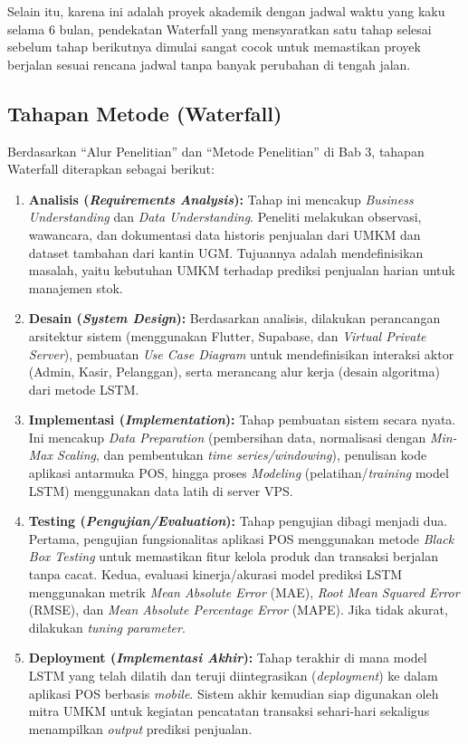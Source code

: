 \documentclass[12pt, a4paper]{article}
\begin{document}
Selain itu, karena ini adalah proyek akademik dengan jadwal waktu yang kaku selama 6 bulan, pendekatan Waterfall yang mensyaratkan satu tahap selesai sebelum tahap berikutnya dimulai sangat cocok untuk memastikan proyek berjalan sesuai rencana jadwal tanpa banyak perubahan di tengah jalan.

\subsection{Tahapan Metode (Waterfall)}
Berdasarkan ``Alur Penelitian'' dan ``Metode Penelitian'' di Bab 3, tahapan Waterfall diterapkan sebagai berikut:

\begin{enumerate}[label=\arabic*)]
    \item \textbf{Analisis (\textit{Requirements Analysis}):}
    Tahap ini mencakup \textit{Business Understanding} dan \textit{Data Understanding}. Peneliti melakukan observasi, wawancara, dan dokumentasi data historis penjualan dari UMKM dan dataset tambahan dari kantin UGM. Tujuannya adalah mendefinisikan masalah, yaitu kebutuhan UMKM terhadap prediksi penjualan harian untuk manajemen stok.
    
    \item \textbf{Desain (\textit{System Design}):}
    Berdasarkan analisis, dilakukan perancangan arsitektur sistem (menggunakan Flutter, Supabase, dan \textit{Virtual Private Server}), pembuatan \textit{Use Case Diagram} untuk mendefinisikan interaksi aktor (Admin, Kasir, Pelanggan), serta merancang alur kerja (desain algoritma) dari metode LSTM.
    
    \item \textbf{Implementasi (\textit{Implementation}):}
    Tahap pembuatan sistem secara nyata. Ini mencakup \textit{Data Preparation} (pembersihan data, normalisasi dengan \textit{Min-Max Scaling}, dan pembentukan \textit{time series/windowing}), penulisan kode aplikasi antarmuka POS, hingga proses \textit{Modeling} (pelatihan/\textit{training} model LSTM) menggunakan data latih di server VPS.
    
    \item \textbf{Testing (\textit{Pengujian/Evaluation}):}
    Tahap pengujian dibagi menjadi dua. Pertama, pengujian fungsionalitas aplikasi POS menggunakan metode \textit{Black Box Testing} untuk memastikan fitur kelola produk dan transaksi berjalan tanpa cacat. Kedua, evaluasi kinerja/akurasi model prediksi LSTM menggunakan metrik \textit{Mean Absolute Error} (MAE), \textit{Root Mean Squared Error} (RMSE), dan \textit{Mean Absolute Percentage Error} (MAPE). Jika tidak akurat, dilakukan \textit{tuning parameter}.
    
    \item \textbf{Deployment (\textit{Implementasi Akhir}):}
    Tahap terakhir di mana model LSTM yang telah dilatih dan teruji diintegrasikan (\textit{deployment}) ke dalam aplikasi POS berbasis \textit{mobile}. Sistem akhir kemudian siap digunakan oleh mitra UMKM untuk kegiatan pencatatan transaksi sehari-hari sekaligus menampilkan \textit{output} prediksi penjualan.
\end{enumerate}
\end{document}
